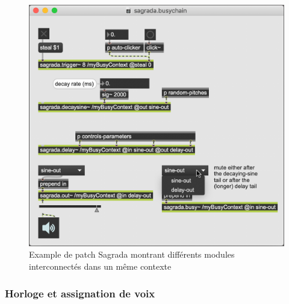 \begin{figure}[!htbp]
	\captionsetup{format=plain}
	\includegraphics[width=\textwidth]{gfx/04_algorithms/Sagrada-examplePatch.png}
	\caption[Sagrada : exemple de patch]{Example de patch Sagrada montrant différents modules interconnectés dans un même contexte}
	\label{fig:algorithms:MP-ExamplePatch}
\end{figure}

\subsubsection{Horloge et assignation de voix}

